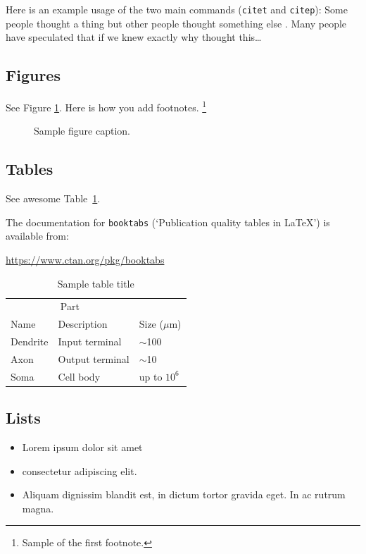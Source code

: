 \documentclass{article}
\begin{document}
Here is an example usage of the two main commands (\verb+citet+ and \verb+citep+): Some people thought a thing \citep{kour2014real, hadash2018estimate} but other people thought something else \citep{kour2014fast}. Many people have speculated that if we knew exactly why \citet{kour2014fast} thought this\dots

\subsection{Figures}
\lipsum[10]
See Figure \ref{fig:fig1}. Here is how you add footnotes. \footnote{Sample of the first footnote.}
\lipsum[11]

\begin{figure}
	\centering
	\fbox{\rule[-.5cm]{4cm}{4cm} \rule[-.5cm]{4cm}{0cm}}
	\caption{Sample figure caption.}
	\label{fig:fig1}
\end{figure}

\subsection{Tables}
See awesome Table~\ref{tab:table}.

The documentation for \verb+booktabs+ (`Publication quality tables in LaTeX') is available from:
\begin{center}
	\url{https://www.ctan.org/pkg/booktabs}
\end{center}


\begin{table}
	\caption{Sample table title}
	\centering
	\begin{tabular}{lll}
		\toprule
		\multicolumn{2}{c}{Part}                   \\
		\cmidrule(r){1-2}
		Name     & Description     & Size ($\mu$m) \\
		\midrule
		Dendrite & Input terminal  & $\sim$100     \\
		Axon     & Output terminal & $\sim$10      \\
		Soma     & Cell body       & up to $10^6$  \\
		\bottomrule
	\end{tabular}
	\label{tab:table}
\end{table}

\subsection{Lists}
\begin{itemize}
	\item Lorem ipsum dolor sit amet
	\item consectetur adipiscing elit.
	\item Aliquam dignissim blandit est, in dictum tortor gravida eget. In ac rutrum magna.
\end{itemize}
\end{document}

